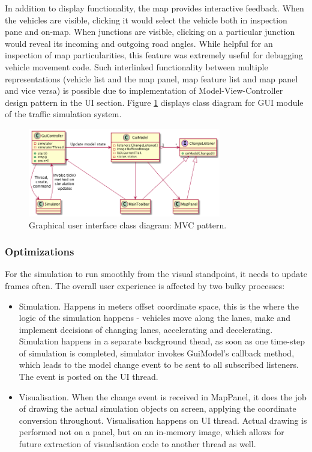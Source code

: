 In addition to display functionality, the map provides interactive feedback. When the vehicles are visible, clicking it would select the vehicle both in inspection pane and on-map. When junctions are visible, clicking on a particular junction would reveal its incoming and outgoing road angles. While helpful for an inspection of map particularities, this feature was extremely useful for debugging vehicle movement code. Such interlinked functionality between multiple representations (vehicle list and the map panel, map feature list and map panel and vice versa) is possible due to implementation of Model-View-Controller design pattern in the UI section. Figure \ref{fig:guiMVC} displays class diagram for GUI module of the traffic simulation system.

\begin{figure}[h]
    \vspace{1.5em}
    \caption{Graphical user interface class diagram: MVC pattern.}
    \label{fig:guiMVC}
    \centering
    \includegraphics[width=0.75\textwidth]{../../uml_diagrams/GUI.png}
\end{figure}

\subsubsection{Optimizations}
For the simulation to run smoothly from the visual standpoint, it needs to update frames often. The overall user experience is affected by two bulky processes:
\begin{itemize}
    \item Simulation. Happens in meters offset coordinate space, this is the where the logic of the simulation happens - vehicles move along the lanes, make and implement decisions of changing lanes, accelerating and decelerating. Simulation happens in a separate background thead, as soon as one time-step of simulation is completed, simulator invokes GuiModel's callback method, which leads to the model change event to be sent to all subscribed listeners. The event is posted on the UI thread.
    \item Visualisation. When the change event is received in MapPanel, it does the job of drawing the actual simulation objects on screen, applying the coordinate conversion throughout. Visualisation happens on UI thread. Actual drawing is performed not on a panel, but on an in-memory image, which allows for future extraction of visualisation code to another thread as well.
\end{itemize}

